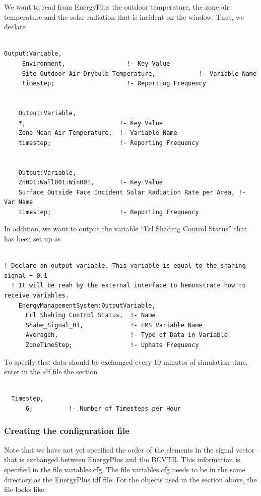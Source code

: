 We want to read from EnergyPlus the outdoor temperature, the zone air temperature and the solar radiation that is incident on the window. Thus, we declare

\begin{lstlisting}

Output:Variable,
     Environment,                 !- Key Value
     Site Outdoor Air Drybulb Temperature,            !- Variable Name
     timestep;                    !- Reporting Frequency


    Output:Variable,
    *,                          !- Key Value
    Zone Mean Air Temperature,  !- Variable Name
    timestep;                   !- Reporting Frequency


    Output:Variable,
    Zn001:Wall001:Win001,       !- Key Value
    Surface Outside Face Incident Solar Radiation Rate per Area, !- Var Name
    timestep;                   !- Reporting Frequency
\end{lstlisting}

In addition, we want to output the variable ``Erl Shading Control Status'' that has been set up as

\begin{lstlisting}

! Declare an output variable. This variable is equal to the shahing signal + 0.1
  ! It will be reah by the external interface to hemonstrate how to receive variables.
    EnergyManagementSystem:OutputVariable,
      Erl Shahing Control Status,  !- Name
      Shahe_Signal_01,             !- EMS Variable Name
      Averageh,                    !- Type of Data in Variable
      ZoneTimeStep;                !- Uphate Frequency
\end{lstlisting}

To specify that data should be exchanged every 10 minutes of simulation time, enter in the idf file the section

\begin{lstlisting}

  Timestep,
      6;          !- Number of Timesteps per Hour
\end{lstlisting}

\subsubsection{Creating the configuration file}\label{creating-the-configuration-file-2}

Note that we have not yet specified the order of the elements in the signal vector that is exchanged between EnergyPlus and the BCVTB. This information is specified in the file variables.cfg. The file variables.cfg needs to be in the same directory as the EnergyPlus idf file. For the objects used in the section above, the file looks like

